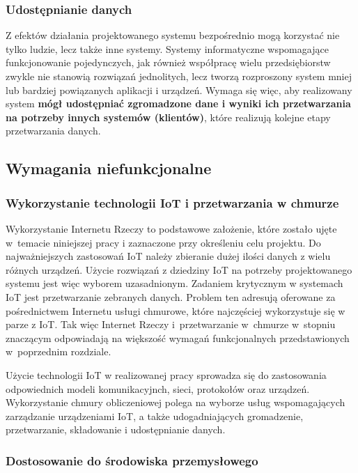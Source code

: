 \documentclass[a4paper, 12pt, twoside]{article}
\begin{document}
\subsubsection{Udostępnianie danych}

Z efektów działania projektowanego systemu bezpośrednio mogą korzystać nie tylko
ludzie, lecz także inne systemy. Systemy informatyczne wspomagające funkcjonowanie 
pojedynczych, jak również współpracę wielu przedsiębiorstw zwykle nie stanowią
rozwiązań jednolitych, lecz tworzą rozproszony system mniej lub bardziej 
powiązanych aplikacji i urządzeń. Wymaga się więc, aby realizowany system \textbf{mógł udostępniać
zgromadzone dane i wyniki ich przetwarzania na potrzeby innych systemów (klientów)}, 
które realizują kolejne etapy przetwarzania danych. 

\subsection{Wymagania niefunkcjonalne}

\subsubsection{Wykorzystanie technologii IoT i przetwarzania w chmurze}

Wykorzystanie Internetu Rzeczy to podstawowe założenie, które zostało ujęte 
w~temacie niniejszej pracy i zaznaczone przy określeniu
celu projektu. Do najważniejszych zastosowań IoT należy zbieranie dużej ilości
danych z wielu różnych urządzeń. Użycie rozwiązań z dziedziny IoT na potrzeby
projektowanego systemu jest więc wyborem uzasadnionym. 
Zadaniem krytycznym w systemach IoT jest przetwarzanie zebranych danych. 
Problem ten adresują oferowane za pośrednictwem Internetu
usługi chmurowe, które najczęściej wykorzystuje się w parze z IoT. Tak więc 
Internet Rzeczy i~przetwarzanie w~chmurze w~stopniu znaczącym odpowiadają na 
większość wymagań funkcjonalnych przedstawionych w~poprzednim rozdziale. 

Użycie technologii IoT
w realizowanej pracy sprowadza się do zastosowania odpowiednich modeli komunikacyjnch, 
sieci, protokołów oraz urządzeń. Wykorzystanie chmury obliczeniowej polega
na wyborze usług wspomagających zarządzanie urządzeniami IoT,
a także udogadniających gromadzenie, przetwarzanie, składowanie i udostępnianie 
danych.

\subsubsection{Dostosowanie do środowiska przemysłowego}
\end{document}
